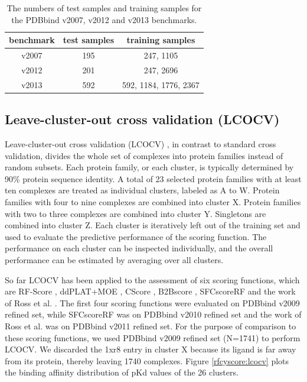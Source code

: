 \begin{table}
\caption{The numbers of test samples and training samples for the PDBbind v2007, v2012 and v2013 benchmarks.}
\label{rfcyscore:benchmarks}
\begin{tabular}{ccc}
\hline
benchmark & test samples & training samples\\
\hline
v2007 & 195 & 247, 1105\\
v2012 & 201 & 247, 2696\\
v2013 & 592 & 592, 1184, 1776, 2367\\
\hline
\end{tabular}
\end{table}

\subsection{Leave-cluster-out cross validation (LCOCV)}

Leave-cluster-out cross validation (LCOCV) \citep{774}, in contrast to standard cross validation, divides the whole set of complexes into protein families instead of random subsets. Each protein family, or each cluster, is typically determined by 90\% protein sequence identity. A total of 23 selected protein families with at least ten complexes are treated as individual clusters, labeled as A to W. Protein families with four to nine complexes are combined into cluster X. Protein families with two to three complexes are combined into cluster Y. Singletons are combined into cluster Z. Each cluster is iteratively left out of the training set and used to evaluate the predictive performance of the scoring function. The performance on each cluster can be inspected individually, and the overall performance can be estimated by averaging over all clusters.

So far LCOCV has been applied to the assessment of six scoring functions, which are RF-Score \citep{774,1194,1410}, ddPLAT+MOE \citep{1414}, CScore \citep{1194}, B2Bscore \citep{1410}, SFCscoreRF \citep{1347} and the work of Ross et al. \citep{1415}. The first four scoring functions were evaluated on PDBbind v2009 refined set, while SFCscoreRF was on PDBbind v2010 refined set and the work of Ross et al. was on PDBbind v2011 refined set. For the purpose of comparison to these scoring functions, we used PDBbind v2009 refined set (N=1741) to perform LCOCV. We discarded the 1xr8 entry in cluster X because its ligand is far away from its protein, thereby leaving 1740 complexes. Figure \ref{rfcyscore:lcocv} plots the binding affinity distribution of pKd values of the 26 clusters.

